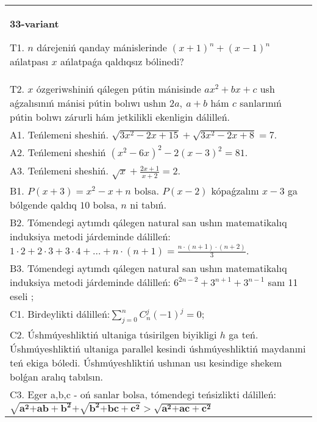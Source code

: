 \documentclass{article}
\begin{document}
\begin{tabular}{m{17cm}}
\textbf{33-variant}
\newline

T1. \(n\) dárejeniń qanday mánislerinde \((x + 1)^{n} + (x - 1)^{n}\) ańlatpası \(x\) ańlatpaǵa qaldıqsız bólinedi? \\
T2. \(x\) ózgeriwshiniń qálegen pútin mánisinde \(ax^{2} + bx + c\) ush aǵzalısınıń mánisi pútin bolıwı ushın \(2a,\ a + b\) hám \(c\) sanlarınıń pútin bolıwı zárurli hám jetkilikli ekenligin dálilleń. \\
A1. Teńlemeni sheshiń. \(\sqrt{3x^{2} - 2x + 15} + \sqrt{3x^{2} - 2x + 8} = 7\). \\
A2. Teńlemeni sheshiń \(\left( x^{2} - 6x \right)^{2} - 2(x - 3)^{2} = 81\). \\
A3. Teńlemeni sheshiń. \(\sqrt{x} + \frac{2x + 1}{x + 2} = 2\). \\
B1. \(P(x + 3) = x^{2} - x + n\) bolsa. \(P(x - 2)\) kópaǵzalını \(x - 3\) ga bólgende qaldıq \(10\) bolsa, \(n\) ni tabıń. \\
B2. Tómendegi aytımdı qálegen natural san ushın matematikalıq induksiya metodi járdeminde dálilleń: \(1 \cdot 2 + 2 \cdot 3 + 3 \cdot 4 + \ldots + n \cdot (n + 1) = \frac{n \cdot (n + 1) \cdot (n + 2)}{3}\). \\
B3. Tómendegi aytımdı qálegen natural san ushın matematikalıq induksiya metodi járdeminde dálilleń: \(6^{2n - 2} + 3^{n + 1} + 3^{n - 1}\) sanı 11 eseli ; \\
C1. Birdeylikti dálilleń:\(\sum_{j = 0}^{n}C_{n}^{j}( - 1)^{j} = 0\); \\
C2. Úshmúyeshliktiń ultaniga túsirilgen biyikligi \(h\) ga teń. Úshmúyeshliktiń ultaniga parallel kesindi úshmúyeshliktiń maydanıni teń ekiga bóledi. Úshmúyeshliktiń ushınan usı kesindige shekem bolǵan aralıq tabılsın. \\
C3. Eger a,b,c - oń sanlar bolsa, tómendegi teńsizlikti dálilleń: \(\sqrt{\mathbf{a}^{\mathbf{2}}\mathbf{+ ab +}\mathbf{b}^{\mathbf{2}}}\mathbf{+}\sqrt{\mathbf{b}^{\mathbf{2}}\mathbf{+ bc +}\mathbf{c}^{\mathbf{2}}}\mathbf{>}\sqrt{\mathbf{a}^{\mathbf{2}}\mathbf{+ ac +}\mathbf{c}^{\mathbf{2}}}\) \\

\end{tabular}
\vspace{1cm}
\end{document}
